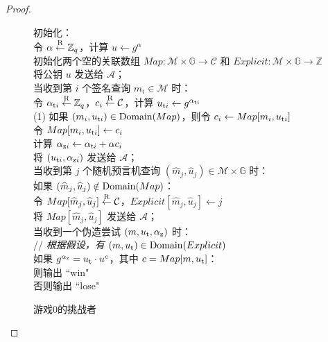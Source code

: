 \begin{proof}
\begin{figure}
  \hspace*{45pt} 初始化：\\
  \hspace*{70pt} 令 $\alpha\overset{\rm R}\leftarrow\mathbb{Z}_q$，计算 $u\leftarrow g^\alpha$\\
  \hspace*{70pt} 初始化两个空的关联数组 $Map:\mathcal{M}\times\mathbb{G}\to\mathcal{C}$ 和 $Explicit:\mathcal{M}\times\mathbb{G}\to\mathbb{Z}$\\
  \hspace*{70pt} 将公钥 $u$ 发送给 $\mathcal{A}$；\\
  \hspace*{45pt} 当收到第 $i$ 个签名查询 $m_i\in\mathcal{M}$ 时：\\
  \hspace*{70pt} 令 $\alpha_{{\rm t}i}\overset{\rm R}\leftarrow\mathbb{Z}_q$，$c_i\overset{\rm R}\leftarrow\mathcal{C}$，计算 $u_{{\rm t}i}\leftarrow g^{\alpha_{{\rm t}i}}$\\
  \hspace*{30pt} (1)
  \hspace*{43pt} 如果 $(m_i,u_{{\rm t}i})\in{\rm Domain}(Map)$，则令 $c_i\leftarrow Map[m_i,u_{{\rm t}i}]$\\
  \hspace*{70pt} 令 $Map[m_i,u_{{\rm t}i}]\leftarrow c_i$\\
  \hspace*{70pt} 计算 $\alpha_{{\rm z}i}\leftarrow\alpha_{{\rm t}i}+\alpha c_i$\\
  \hspace*{70pt} 将 $(u_{{\rm t}i},\alpha_{{\rm z}i})$ 发送给 $\mathcal{A}$；\\
  \hspace*{45pt} 当收到第 $j$ 个随机预言机查询 $(\hat m_j,\hat u_j)\in\mathcal{M}\times\mathbb{G}$ 时：\\
  \hspace*{70pt} 如果 $(\widehat m_j,\widehat u_j)\notin{\rm Domain}(Map)$：\\
  \hspace*{95pt} 令 $Map[\widehat m_j,\widehat u_j]\overset{\rm R}\leftarrow\mathcal{C}$，$Explicit[\widehat m_j,\widehat u_j]\leftarrow j$\\
  \hspace*{70pt} 将 $Map[\hat m_j,\hat u_j]$ 发送给 $\mathcal{A}$；\\
  \hspace*{45pt} 当收到一个伪造尝试 $(m,u_{\rm t},\alpha_{\rm z})$ 时：\\
  \hspace*{70pt} // \emph{根据假设，有 $(m,u_{\rm t})\in{\rm Domain}(Explicit)$}\\
  \hspace*{70pt} 如果 $g^{\alpha_{\rm z}}=u_{\rm t}\cdot u^c$，其中 $c=Map[m,u_{\rm t}]$：\\
  \hspace*{95pt} 则输出 ``win"\\
  \hspace*{95pt} 否则输出 ``lose"
  \caption{游戏0的挑战者}
  \label{fig:19-3}
\end{figure}


\end{proof}
